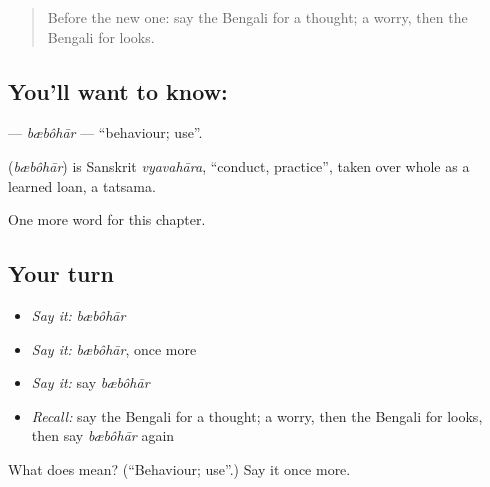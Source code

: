 \begin{quote}
Before the new one: say the Bengali for a thought; a worry, then the Bengali for looks.
\end{quote}

\subsection*{You'll want to know: }
\textbf{} — \emph{bæbôhār} — \textquotedblleft{}behaviour; use\textquotedblright{}.

\begin{cousinweb}
\textbf{} (\emph{bæbôhār}) is Sanskrit \emph{vyavahāra}, \textquotedblleft{}conduct, practice\textquotedblright{}, taken over whole as a learned loan, a tatsama.
\end{cousinweb}

\begin{grammarlens}[title={What you've built}]
One more word for this chapter.
\end{grammarlens}

\subsection*{Your turn}
\begin{itemize}
\raggedright
  \item \emph{Say it:} \emph{bæbôhār}
  \item \emph{Say it:} \emph{bæbôhār}, once more
  \item \emph{Say it:} say \emph{bæbôhār}
  \item \emph{Recall:} say the Bengali for a thought; a worry, then the Bengali for looks, then say \emph{bæbôhār} again
\end{itemize}

\begin{tcolorbox}[breakable,colback=teal!4,colframe=teal!35!black,title={Before you move on}]
What does  mean? (\textquotedblleft{}Behaviour; use\textquotedblright{}.) Say it once more.
\end{tcolorbox}
